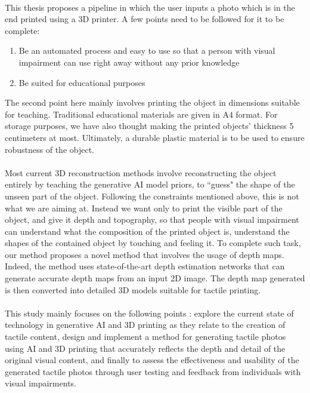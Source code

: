 \documentclass[12pt, letterpaper]{article}
\begin{document}
\begin{spacing}{1.15}
\paragraph{}
This thesis proposes a pipeline in which the user inputs a photo which is in the end printed using a 3D printer. A few points need to be followed for
it to be complete:
\begin{enumerate}
    \item Be an automated process and easy to use so that a person with visual impairment can use right away without any prior knowledge
    \item Be suited for educational purposes
\end{enumerate}
The second point here mainly involves printing the object in dimensions suitable for teaching. Traditional educational materials are given in A4
format. For storage purposes, we have also thought making the printed objects' thickness 5 centimeters at most. Ultimately, a durable plastic material
is to be used to ensure robustness of the object.
\paragraph{}
Most current 3D reconstruction methods involve reconstructing the object entirely by teaching the generative AI model priors, to ``guess" the shape of
the unseen part of the object. Following the constraints mentioned above, this is not what we are aiming at.
Instead we want only to print the visible part of the object, and give it depth and topography, so that people with visual impairment can understand
what the composition of the printed object is, understand the shapes of the contained object by touching and feeling it.
To complete such task, our method proposes a novel method that involves the usage of depth maps. Indeed, the method uses state-of-the-art depth estimation
networks that can generate accurate depth maps from an input 2D image. The depth map generated is then converted into detailed 3D models suitable
for tactile printing.
\paragraph{}
This study mainly focuses on the following points : explore the current state of technology in generative AI and 3D printing as they relate to
the creation of tactile content, design and implement a method for generating tactile photos using AI and 3D printing that accurately reflects
the depth and detail of the original visual content, and finally to assess the effectiveness and usability of the generated tactile photos through
user testing and feedback from individuals with visual impairments.

\end{spacing}
\end{document}
